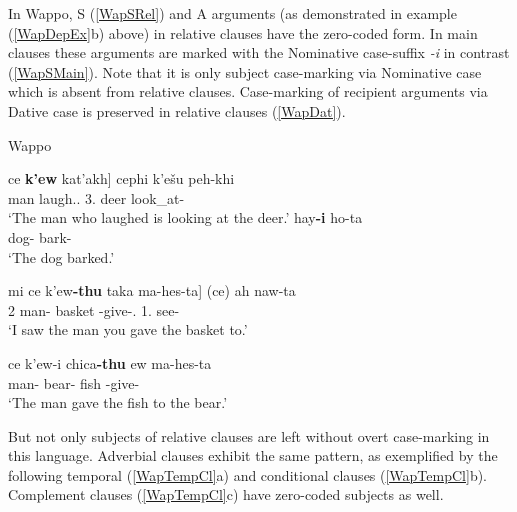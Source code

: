 In  Wappo, S (\ref{WapSRel}) and A arguments (as demonstrated in example (\ref{WapDepEx}b) above)  in relative clauses have the zero-coded form. 
In main clauses these arguments are marked with the Nominative case-suffix \emph{-i} in contrast (\ref{WapSMain}).
Note that it is only subject case-marking via Nominative case which is absent from relative clauses. 
Case-marking of recipient arguments via Dative case is preserved in relative clauses (\ref{WapDat}).

\begin{exe} \ex\label{WapRelS} {Wappo} \citep[Wappo-Yukian; California; ][117, 41]{Thompsonetal:2006}\nopagebreak[4]
\begin{xlist} 
\ex\label{WapSRel} \gll  {\rm[}ce \textbf{k'ew} kat'akh{\rm]} cephi k'e\v su peh-khi\textglotstop\\
\dem{} man laugh.\stat{}.\dep{} 3\sg{}.\nom{} deer look\_at-\stat{}\\
`The man who laughed is looking at the deer.' %
\ex\label{WapSMain} \gll hay\textbf{-i} ho\textglotstop -ta\textglotstop\\
dog-\nom{} bark-\pst{}\\
`The dog barked.' %
\end{xlist}
\end{exe}

\enlargethispage{\baselineskip}

\begin{exe}\ex\label{WapDat}
\begin{xlist} 
\ex\label{WapDatRel}\gll  {\rm[}mi ce k'ew\textbf{-thu} {taka\textglotstop} ma-hes-ta{\rm]} (ce) ah naw-ta\textglotstop\\
2\sg{} \dem{} man-\dat{} basket \dir{}-give-\pst{}.\dep{} \dem{} 1\sg{}.\nom{} see-\pst{}\\
\glt `I saw the man you gave the basket to.' %

\ex\label{WapDatMain}\gll ce k'ew-i chica\textbf{-thu}  ew ma-hes-ta\textglotstop\\
\dem{} man-\nom{} bear-\dat{} fish \dir{}-give-\pst{}\\
\glt `The man gave the fish to the bear.' %
\end{xlist}
\end{exe}

But not only subjects of relative clauses are left without overt case-marking in this language.
Adverbial clauses exhibit the same pattern, as exemplified by the following  temporal (\ref{WapTempCl}a) and conditional clauses (\ref{WapTempCl}b). 
Complement clauses (\ref{WapTempCl}c) have zero-coded subjects as well.

